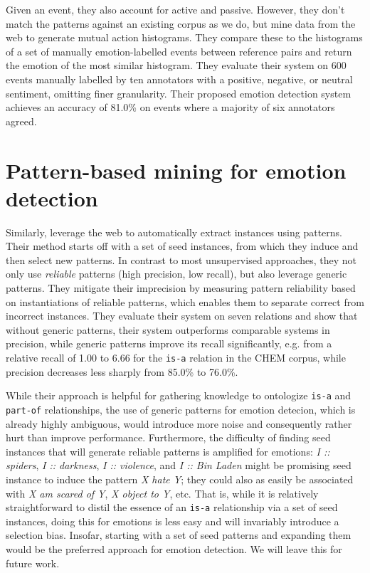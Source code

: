 Given an event, they also account for active and passive. However, they don't match the patterns against an existing corpus as we do, but mine data from the web to generate mutual action histograms. They compare these to the histograms of a set of manually emotion-labelled events between reference pairs and return the emotion of the most similar histogram. They evaluate their system on 600 events manually labelled by ten annotators with a positive, negative, or neutral sentiment, omitting finer granularity. Their proposed emotion detection system achieves an accuracy of 81.0\% on events where a majority of six annotators agreed.

\section{Pattern-based mining for emotion detection} \label{sec:web-mining}

Similarly, \citeauthor{harvesting_ontologizing} leverage the web to automatically extract instances using patterns. Their method starts off with a set of seed instances, from which they induce and then select new patterns. In contrast to most unsupervised approaches, they not only use \emph{reliable} patterns (high precision, low recall), but also leverage generic patterns. They mitigate their imprecision by measuring pattern reliability based on instantiations of reliable patterns, which enables them to separate correct from incorrect instances. They evaluate their system on seven relations and show that without generic patterns, their system outperforms comparable systems in precision, while generic patterns improve its recall significantly, e.g. from a relative recall of 1.00 to 6.66 for the \texttt{is-a} relation in the \textsc{CHEM} corpus, while precision decreases less sharply from 85.0\% to 76.0\%.

While their approach is helpful for gathering knowledge to ontologize \texttt{is-a} and \texttt{part-of} relationships, the use of generic patterns for emotion detecion, which is already highly ambiguous, would introduce more noise and consequently rather hurt than improve performance. Furthermore, the difficulty of finding seed instances that will generate reliable patterns is amplified for emotions: \textit{I :: spiders}, \textit{I :: darkness},  \textit{I :: violence}, and \textit{I :: Bin Laden} might be promising seed instance to induce the pattern \textit{X hate Y}; they could also as easily be associated with \textit{X am scared of Y}, \textit{X object to Y}, etc. That is, while it is relatively straightforward to distil the essence of an \texttt{is-a} relationship via a set of seed instances, doing this for emotions is less easy and will invariably introduce a selection bias. Insofar, starting with a set of seed patterns and expanding them would be the preferred approach for emotion detection. We will leave this for future work.

